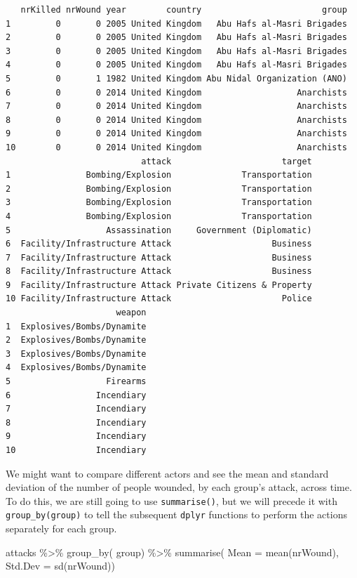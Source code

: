 \documentclass[
  letterpaper,
  DIV=11,
  numbers=noendperiod]{scrreprt}
\newenvironment{Shaded}{\begin{snugshade}}{\end{snugshade}}
\newcommand{\AttributeTok}[1]{\textcolor[rgb]{0.40,0.45,0.13}{#1}}
\newcommand{\FunctionTok}[1]{\textcolor[rgb]{0.28,0.35,0.67}{#1}}
\newcommand{\NormalTok}[1]{\textcolor[rgb]{0.00,0.23,0.31}{#1}}
\newcommand{\SpecialCharTok}[1]{\textcolor[rgb]{0.37,0.37,0.37}{#1}}
\begin{document}
\begin{verbatim}
   nrKilled nrWound year        country                        group
1         0       0 2005 United Kingdom   Abu Hafs al-Masri Brigades
2         0       0 2005 United Kingdom   Abu Hafs al-Masri Brigades
3         0       0 2005 United Kingdom   Abu Hafs al-Masri Brigades
4         0       0 2005 United Kingdom   Abu Hafs al-Masri Brigades
5         0       1 1982 United Kingdom Abu Nidal Organization (ANO)
6         0       0 2014 United Kingdom                   Anarchists
7         0       0 2014 United Kingdom                   Anarchists
8         0       0 2014 United Kingdom                   Anarchists
9         0       0 2014 United Kingdom                   Anarchists
10        0       0 2014 United Kingdom                   Anarchists
                           attack                      target
1               Bombing/Explosion              Transportation
2               Bombing/Explosion              Transportation
3               Bombing/Explosion              Transportation
4               Bombing/Explosion              Transportation
5                   Assassination     Government (Diplomatic)
6  Facility/Infrastructure Attack                    Business
7  Facility/Infrastructure Attack                    Business
8  Facility/Infrastructure Attack                    Business
9  Facility/Infrastructure Attack Private Citizens & Property
10 Facility/Infrastructure Attack                      Police
                      weapon
1  Explosives/Bombs/Dynamite
2  Explosives/Bombs/Dynamite
3  Explosives/Bombs/Dynamite
4  Explosives/Bombs/Dynamite
5                   Firearms
6                 Incendiary
7                 Incendiary
8                 Incendiary
9                 Incendiary
10                Incendiary
\end{verbatim}

We might want to compare different actors and see the mean and standard
deviation of the number of people wounded, by each group's attack,
across time. To do this, we are still going to use \texttt{summarise()},
but we will precede it with \texttt{group\_by(group)} to tell the
subsequent \texttt{dplyr} functions to perform the actions separately
for each group.

\begin{Shaded}
\begin{Highlighting}[]
\NormalTok{attacks }\SpecialCharTok{\%\textgreater{}\%}
  \FunctionTok{group\_by}\NormalTok{( group) }\SpecialCharTok{\%\textgreater{}\%}
  \FunctionTok{summarise}\NormalTok{( }\AttributeTok{Mean =} \FunctionTok{mean}\NormalTok{(nrWound), }
             \AttributeTok{Std.Dev =} \FunctionTok{sd}\NormalTok{(nrWound))}
\end{Highlighting}
\end{Shaded}
\end{document}
